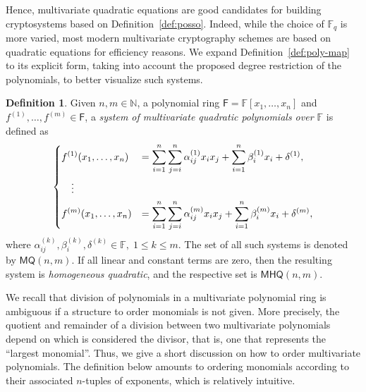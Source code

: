 \documentclass[12pt, a4paper, oneside]{memoir}
\theoremstyle{definition}
\newtheorem{definition}[theorem]{Definition}
\begin{document}
Hence, multivariate quadratic equations are good candidates for building cryptosystems based on Definition~\ref{def:posso}. Indeed, while the choice of $\mathbb{F}_{q}$ is more varied, most modern multivariate cryptography schemes are based on quadratic equations for efficiency reasons. We expand Definition~\ref{def:poly-map} to its explicit form, taking into account the proposed degree restriction of the polynomials, to better visualize such systems.

\begin{definition}\label{def:quad-poly-sys}
  Given $n, m \in \mathbb{N}$, a polynomial ring $\mathsf{F} = \mathbb{F}[x_{1}, \dots, x_{n}]$ and $f^{(1)}, \dots, f^{(m)} \in \mathsf{F}$, a \emph{system of multivariate quadratic polynomials over $\mathbb{F}$} is defined as
  \begin{align}
    \begin{split}
      \begin{dcases}
        f^{(1)}(x_{1}, \dots, x_{n}) &= 
          \sum_{i = 1}^{n} \sum_{j = i}^{n} \alpha_{ij}^{(1)} x_{i} x_{j}
            + \sum_{i = 1}^{n} \beta_{i}^{(1)} x_{i} + \delta^{(1)}, \\
        \quad \vdots \\
        f^{(m)}(x_{1}, \dots, x_{n}) &= 
          \sum_{i = 1}^{n} \sum_{j = i}^{n} \alpha_{ij}^{(m)} x_{i} x_{j}
            + \sum_{i = 1}^{n} \beta_{i}^{(m)} x_{i} + \delta^{(m)},
      \end{dcases}
    \end{split}
  \end{align}
  where $\alpha_{ij}^{(k)}, \beta_{i}^{(k)}, \delta^{(k)} \in \mathbb{F},\; 1 \leq k \leq m$. The set of all such systems is denoted by $\mathsf{MQ}(n, m)$. If all linear and constant terms are zero, then the resulting system is \emph{homogeneous quadratic}, and the respective set is $\mathsf{MHQ}(n, m)$.
\end{definition}

We recall that division of polynomials in a multivariate polynomial ring is ambiguous if a structure to order monomials is not given. More precisely, the quotient and remainder of a division between two multivariate polynomials depend on which is considered the divisor, that is, one that represents the ``largest monomial''. Thus, we give a short discussion on how to order multivariate polynomials. The definition below amounts to ordering monomials according to their associated $n$-tuples of exponents, which is relatively intuitive. 
\end{document}
